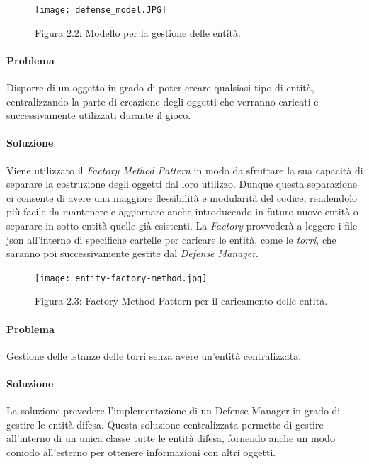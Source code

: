 \documentclass[a4paper,12pt]{report}
\begin{document}
\begin{figure}[H]
    \centering
    \texttt{[image: defense\_model.JPG]}
    \caption{Figura 2.2: Modello per la gestione delle entità.}
    \label{fig:defense-model}
\end{figure}

\paragraph{Problema}
Disporre di un oggetto in grado di poter creare qualsiasi tipo di entità, centralizzando la parte di creazione degli oggetti che verranno caricati e successivamente utilizzati
durante il gioco.

\paragraph{Soluzione}
Viene utilizzato il \textit{Factory Method Pattern} in modo da sfruttare la sua capacità di separare la costruzione degli oggetti dal loro utilizzo. Dunque questa separazione ci consente di avere una maggiore flessibilità e modularità del codice, rendendolo più facile da mantenere e aggiornare anche introducendo in futuro nuove entità o separare in sotto-entità quelle già esistenti. 
La \textit{Factory} provvederà a leggere i file json all'interno di specifiche cartelle per caricare
le entità, come le \textit{torri}, che saranno poi successivamente gestite dal \textit{Defense Manager}.

\begin{figure}[H]
    \centering
    \texttt{[image: entity-factory-method.jpg]}
    \caption{Figura 2.3: Factory Method Pattern per il caricamento delle entità.}
    \label{fig:entity-factory-method}
\end{figure}

\paragraph{Problema}
Gestione delle istanze delle torri senza avere un'entità centralizzata.
\paragraph{Soluzione}
La soluzione prevedere l'implementazione di un Defense Manager in grado di gestire le entità difesa. Questa soluzione centralizzata permette di gestire all'interno di un unica classe tutte le entità difesa, fornendo anche un modo comodo all'esterno per ottenere informazioni con altri oggetti.
\end{document}
